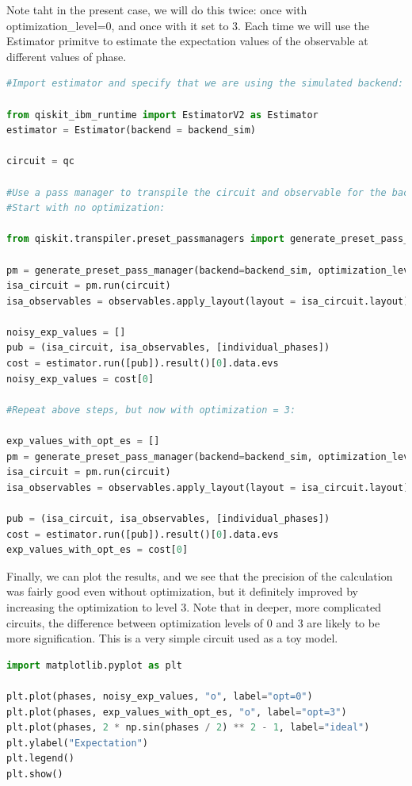 \documentclass[12pt, oneside]{book}
\theoremstyle{definition}
\theoremstyle{definition}
\theoremstyle{remark}
\begin{document}
Note taht in the present case, we will do this twice: once with optimization\_level=0, and once with it set to 3. Each time we will use the Estimator primitve to estimate the expectation values of the observable at different values of phase.

\begin{lstlisting}[language=Python]
#Import estimator and specify that we are using the simulated backend:

from qiskit_ibm_runtime import EstimatorV2 as Estimator
estimator = Estimator(backend = backend_sim)

circuit = qc

#Use a pass manager to transpile the circuit and observable for the backend being simulated.
#Start with no optimization:

from qiskit.transpiler.preset_passmanagers import generate_preset_pass_manager

pm = generate_preset_pass_manager(backend=backend_sim, optimization_level=0)
isa_circuit = pm.run(circuit)
isa_observables = observables.apply_layout(layout = isa_circuit.layout)

noisy_exp_values = []
pub = (isa_circuit, isa_observables, [individual_phases])
cost = estimator.run([pub]).result()[0].data.evs
noisy_exp_values = cost[0]

#Repeat above steps, but now with optimization = 3:

exp_values_with_opt_es = []
pm = generate_preset_pass_manager(backend=backend_sim, optimization_level=3)
isa_circuit = pm.run(circuit)
isa_observables = observables.apply_layout(layout = isa_circuit.layout)

pub = (isa_circuit, isa_observables, [individual_phases])
cost = estimator.run([pub]).result()[0].data.evs
exp_values_with_opt_es = cost[0]
\end{lstlisting}

Finally, we can plot the results, and we see that the precision of the calculation was fairly good even without optimization, but it definitely improved by increasing the optimization to level 3. Note that in deeper, more complicated circuits, the difference between optimization levels of 0 and 3 are likely to be more signification. This is a very simple circuit used as a toy model.

\begin{lstlisting}[language=Python]
import matplotlib.pyplot as plt

plt.plot(phases, noisy_exp_values, "o", label="opt=0")
plt.plot(phases, exp_values_with_opt_es, "o", label="opt=3")
plt.plot(phases, 2 * np.sin(phases / 2) ** 2 - 1, label="ideal")
plt.ylabel("Expectation")
plt.legend()
plt.show()
\end{lstlisting}
\end{document}

